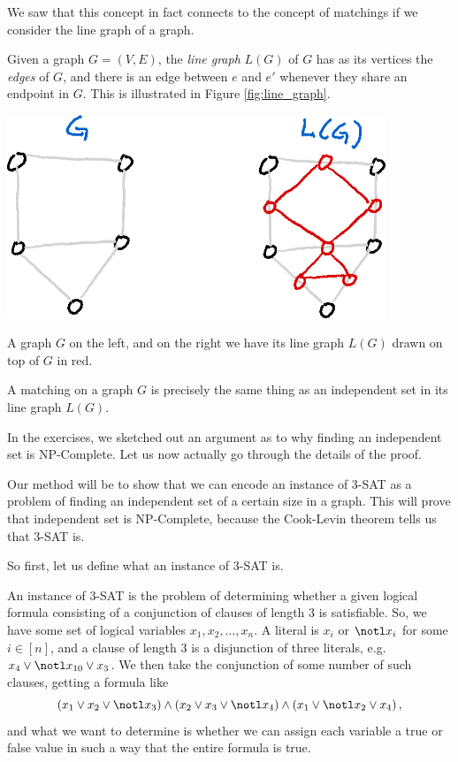 \documentclass[nobib]{tufte-handout}
\begin{document}
We saw that this concept in fact connects to the concept of matchings if we consider the line graph of a graph.

\begin{definition}
    Given a graph $G = (V, E)$, the \emph{line graph} $L(G)$ of $G$ has as its vertices the \emph{edges} of $G$, and there is an edge between $e$ and $e'$ whenever they share an endpoint in $G$. This is illustrated in Figure \ref{fig:line_graph}.
\end{definition}

\begin{marginfigure}
    \centering
    \includegraphics[width=0.85\textwidth]{graphics/L8_vx_covers_hamiltonicity_etc/line_graph.png}
    \caption{A graph $G$ on the left, and on the right we have its line graph $L(G)$ drawn on top of $G$ in red.}
    \label{fig:line_graph}
\end{marginfigure}

\begin{remark}
    A matching on a graph $G$ is precisely the same thing as an independent set in its line graph $L(G)$.
\end{remark}

In the exercises, we sketched out an argument as to why finding an independent set is NP-Complete. Let us now actually go through the details of the proof.

Our method will be to show that we can encode an instance of 3-SAT as a problem of finding an independent set of a certain size in a graph. This will prove that independent set is NP-Complete, because the Cook-Levin theorem tells us that 3-SAT is.

So first, let us define what an instance of 3-SAT is.

\begin{definition}
    An instance of 3-SAT is the problem of determining whether a given logical formula consisting of a conjunction of clauses of length $3$ is satisfiable. So, we have some set of logical variables $x_1, x_2, \ldots, x_n$. A literal is $x_i$ or $\notl x_i$ for some $i \in [n]$, and a clause of length $3$ is a disjunction of three literals, e.g. $x_4\vee \notl x_{10} \vee x_3$. We then take the conjunction of some number of such clauses, getting a formula like
    $$\left(x_1 \vee x_2 \vee \notl x_3\right) \wedge \left(x_2 \vee x_3 \vee \notl x_4\right) \wedge \left(x_1 \vee \notl x_2 \vee x_4\right),$$
    and what we want to determine is whether we can assign each variable a true or false value in such a way that the entire formula is true.
\end{definition}
\end{document}
